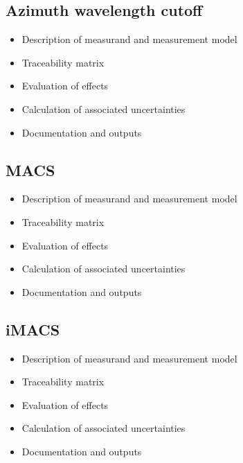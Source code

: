 \documentclass[a4paper,10pt,english]{sphinxmanual}
\begin{document}
\subsection{Azimuth wavelength cutoff}
\label{\detokenize{04_uncertainty_analysis:azimuth-wavelength-cutoff}}\begin{itemize}
\item {} 
\sphinxAtStartPar
Description of measurand and measurement model

\item {} 
\sphinxAtStartPar
Traceability matrix

\item {} 
\sphinxAtStartPar
Evaluation of effects

\item {} 
\sphinxAtStartPar
Calculation of associated uncertainties

\item {} 
\sphinxAtStartPar
Documentation and outputs

\end{itemize}


\subsection{MACS}
\label{\detokenize{04_uncertainty_analysis:macs}}\begin{itemize}
\item {} 
\sphinxAtStartPar
Description of measurand and measurement model

\item {} 
\sphinxAtStartPar
Traceability matrix

\item {} 
\sphinxAtStartPar
Evaluation of effects

\item {} 
\sphinxAtStartPar
Calculation of associated uncertainties

\item {} 
\sphinxAtStartPar
Documentation and outputs

\end{itemize}


\subsection{iMACS}
\label{\detokenize{04_uncertainty_analysis:imacs}}\begin{itemize}
\item {} 
\sphinxAtStartPar
Description of measurand and measurement model

\item {} 
\sphinxAtStartPar
Traceability matrix

\item {} 
\sphinxAtStartPar
Evaluation of effects

\item {} 
\sphinxAtStartPar
Calculation of associated uncertainties

\item {} 
\sphinxAtStartPar
Documentation and outputs

\end{itemize}
\end{document}
